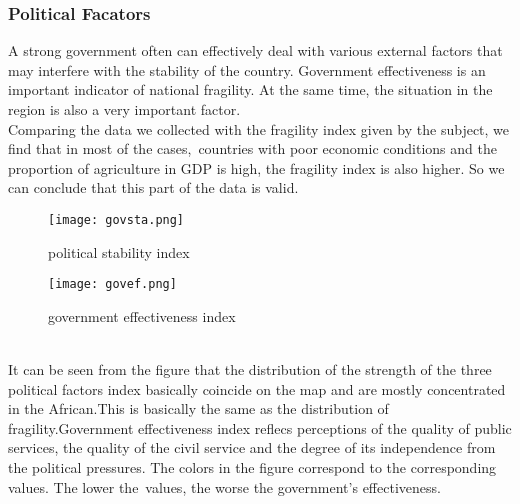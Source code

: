 \documentclass{mcmthesis}
\begin{document}
\subsubsection{Political Facators}
A strong government often can effectively deal with various external factors that may interfere with the stability of the country. Government effectiveness is an important indicator of national fragility. At the same time, the situation in the region is also a very important factor.\\
Comparing the data we collected with the fragility index given by the subject, we find that in most of the cases, countries with poor economic conditions and the proportion of agriculture in GDP is high, the fragility index is also higher. So we can conclude that this part of the data is valid.\\
\begin{figure}[h]
  \centering
  \begin{minipage}[h]{0.48\textwidth}
  \centering
  \texttt{[image: govsta.png]}
  \caption{political stability index}
  \end{minipage}
  \begin{minipage}[h]{0.48\textwidth}
  \centering
  \texttt{[image: govef.png]}
  \caption{government effectiveness index}
  \end{minipage}
\end{figure}\\
It can be seen from the figure that the distribution of the strength of the three political factors index basically coincide on the map and are mostly concentrated in the African.This is basically the same as the distribution of fragility.Government effectiveness index reflecs perceptions of the quality of public services, the quality of the civil service and the degree of its independence from the political pressures. The colors in the figure correspond to the corresponding values. The lower the values, the worse the government’s effectiveness.
\end{document}
